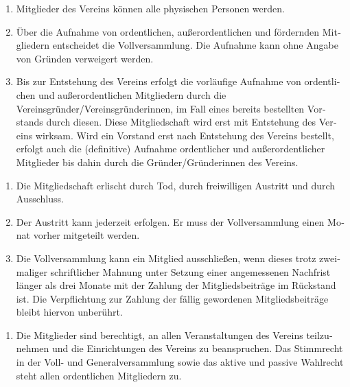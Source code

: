 \begin{otherlanguage}{german}

\begin{enumerate}[statutenenum]
    \item Mitglieder des Vereins können alle physischen Personen werden.

    \item Über die Aufnahme von ordentlichen, außerordentlichen und fördernden Mitgliedern entscheidet die Vollversammlung.
        Die Aufnahme kann ohne Angabe von Gründen verweigert werden.

    \item Bis zur Entstehung des Vereins erfolgt die vorläufige Aufnahme von ordentlichen und außerordentlichen Mitgliedern durch die Vereinsgründer/Vereinsgründerinnen, im Fall eines bereits bestellten Vorstands durch diesen.
        Diese Mitgliedschaft wird erst mit Entstehung des Vereins wirksam.
        Wird ein Vorstand erst nach Entstehung des Vereins bestellt, erfolgt auch die (definitive) Aufnahme ordentlicher und außerordentlicher Mitglieder bis dahin durch die Gründer/Gründerinnen des Vereins.
\end{enumerate}


\begin{enumerate}[statutenenum]
    \item Die Mitgliedschaft erlischt durch Tod, durch freiwilligen Austritt und durch Ausschluss.

    \item Der Austritt kann jederzeit erfolgen.
        Er muss der Vollversammlung einen Monat vorher mitgeteilt werden.

    \item Die Vollversammlung kann ein Mitglied ausschließen, wenn dieses trotz zweimaliger schriftlicher Mahnung unter Setzung einer angemessenen Nachfrist länger als drei Monate mit der Zahlung der Mitgliedsbeiträge im Rückstand ist.
        Die Verpflichtung zur Zahlung der fällig gewordenen Mitgliedsbeiträge bleibt hiervon unberührt.
\end{enumerate}


\begin{enumerate}[statutenenum]
    \item Die Mitglieder sind berechtigt, an allen Veranstaltungen des Vereins teilzunehmen und die Einrichtungen des Vereins zu beanspruchen.
        Das Stimmrecht in der Voll- und Generalversammlung sowie das aktive und passive Wahlrecht steht allen ordentlichen Mitgliedern zu.


\end{enumerate}
\end{otherlanguage}
